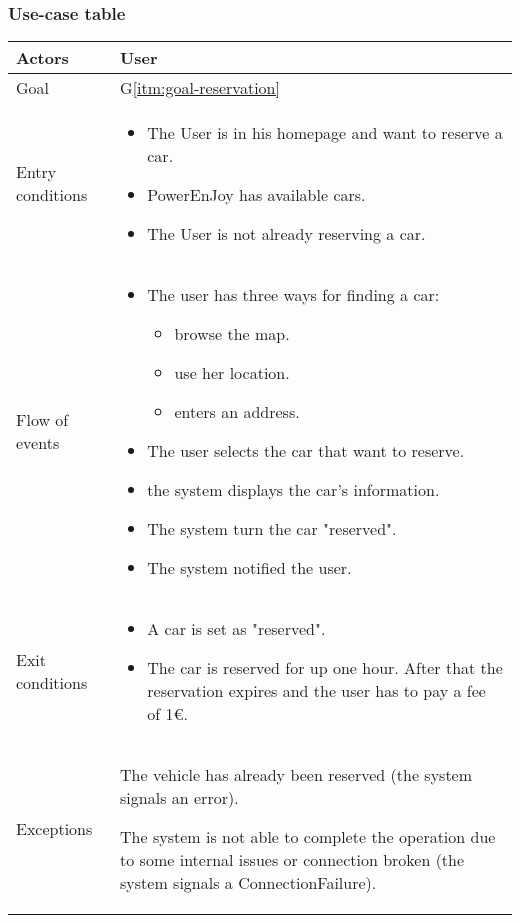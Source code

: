 \newpage
\subsubsection{Use-case table}
\begin{center}
  \begin{tabular}{ l | p{10cm} }
    \hline
    Actors & User\\ \hline
    Goal & G\ref{itm:goal-reservation}\\ \hline
    Entry conditions & \begin{itemize}
			\item The User is in his homepage and want to reserve a car.
			\item PowerEnJoy has available cars.
			\item The User is not already reserving a car.
\end{itemize}  \\ \hline
    Flow of events &
\begin{itemize}
\item The user has three ways for finding a car:
\begin{itemize}
			\item browse the map.
			\item use her location.
			\item enters an address.
\end{itemize}
\item The user selects the car that want to reserve.
\item the system displays the car's information.%
\item The system turn the car "reserved".%
\item The system notified the user.
\end{itemize} \\ \hline
    Exit conditions &
\begin{itemize}
	\item A car is set as "reserved".
	\item The car is reserved for up one hour. After that the reservation expires and the user has to pay a fee of 1€.
\end{itemize}  \\ \hline
  Exceptions & 
\item The vehicle has already been reserved (the system signals an error).
\item The system is not able to complete the operation due to some internal issues or connection broken (the system signals a ConnectionFailure).
\end{itemize} 
\\ \hline
  \end{tabular}
\end{center}


